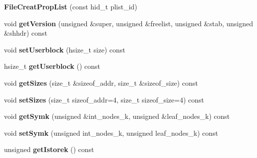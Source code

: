 \begin{DoxyCompactItemize}
{\bfseries File\+Creat\+Prop\+List} (const hid\+\_\+t plist\+\_\+id)
\item 
\mbox{\label{class_h5_1_1_file_creat_prop_list_a9425a6733afd9b92e48081d88d69c266}} 
void {\bfseries get\+Version} (unsigned \&super, unsigned \&freelist, unsigned \&stab, unsigned \&shhdr) const
\item 
\mbox{\label{class_h5_1_1_file_creat_prop_list_a10c019e904c9f6711a5cd329c8241fb7}} 
void {\bfseries set\+Userblock} (hsize\+\_\+t size) const
\item 
\mbox{\label{class_h5_1_1_file_creat_prop_list_a2bae11df6210d3ece7764496de218b7f}} 
hsize\+\_\+t {\bfseries get\+Userblock} () const
\item 
\mbox{\label{class_h5_1_1_file_creat_prop_list_a446d9692fa76ec20092538b8c432c29d}} 
void {\bfseries get\+Sizes} (size\+\_\+t \&sizeof\+\_\+addr, size\+\_\+t \&sizeof\+\_\+size) const
\item 
\mbox{\label{class_h5_1_1_file_creat_prop_list_a31c6772abfcd5aa5d89504fb55ad6604}} 
void {\bfseries set\+Sizes} (size\+\_\+t sizeof\+\_\+addr=4, size\+\_\+t sizeof\+\_\+size=4) const
\item 
\mbox{\label{class_h5_1_1_file_creat_prop_list_a9ba5a77338151c09146ea2b1c0e2d0ee}} 
void {\bfseries get\+Symk} (unsigned \&int\+\_\+nodes\+\_\+k, unsigned \&leaf\+\_\+nodes\+\_\+k) const
\item 
\mbox{\label{class_h5_1_1_file_creat_prop_list_a920c10c036827a7a815133fe648097ae}} 
void {\bfseries set\+Symk} (unsigned int\+\_\+nodes\+\_\+k, unsigned leaf\+\_\+nodes\+\_\+k) const
\item 
\mbox{\label{class_h5_1_1_file_creat_prop_list_ae1036509e3817523e0fdb8b14bb11d81}} 
unsigned {\bfseries get\+Istorek} () const
\item 
\mbox{\label{class_h5_1_1_file_creat_prop_list_a80007f921e9d8b32848b3a5623d30b8e}} 

\end{DoxyCompactItemize}
